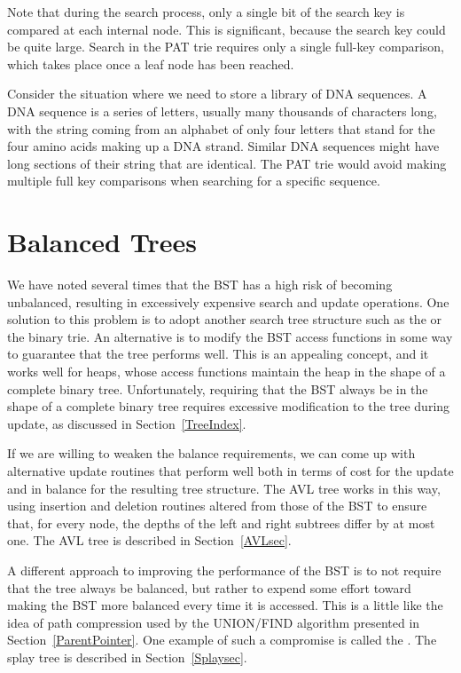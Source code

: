 Note that during the search process, only a single bit of the search
key is compared at each internal node.
This is significant, because the search key could be quite large.
Search in the PAT trie requires only a single full-key comparison,
which takes place once a leaf node has been reached.

\begin{example}
Consider the situation where we need to store a library of DNA
sequences.
A DNA sequence is a series of letters, usually many thousands of
characters long, with the string coming from an alphabet of only four
letters that stand for the four amino acids making up a DNA strand.
Similar DNA sequences might have long sections of their string that are
identical.
The PAT trie would avoid making multiple full key comparisons when
searching for a specific sequence.
\end{example}

\section{Balanced Trees}
\label{BalancedTree}

We have noted several times that the BST has a high risk of
becoming unbalanced, resulting in excessively expensive search and
update operations.
One solution to this problem is to adopt another search
tree
structure such as the \TTtree{}
or the binary trie.
An alternative is to modify the BST access functions in some way to
guarantee that the tree performs well.
This is an appealing concept, and it works well for heaps,
whose access functions maintain the heap in the shape of a complete
binary tree.
Unfortunately, requiring that the BST always be in the shape of a
complete binary tree requires excessive modification to the tree
during update, as discussed in Section~\ref{TreeIndex}.

If we are willing to weaken the balance requirements, we can come up
with alternative update routines that perform well both in terms of
cost for the update and in balance for the resulting tree structure.
The AVL tree works in this way, using
insertion and deletion routines
altered from those of the BST to ensure that, for every node, the
depths of the left and right subtrees differ by at most one.
The AVL tree is described in Section~\ref{AVLsec}.

A different approach to improving the performance of the BST is to
not require that the tree always be balanced, but rather to expend
some effort toward making the BST more balanced every time it
is accessed.
This is a little like the idea of path compression used by the
UNION/FIND algorithm presented in Section~\ref{ParentPointer}.
One example of such a compromise is called the .
The splay tree is described in Section~\ref{Splaysec}.

